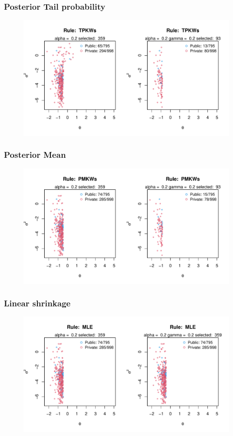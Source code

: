 \documentclass[10pt,mathserif]{beamer}
\begin{document}
\begin{frame}
  \frametitle{Posterior Tail probability}
  \begin{figure}
    \centering
    \includegraphics[width=\textwidth]{../../Figures/2013-2022/GMM/GLVmix/Left_0.2_0.2_TPKWs.pdf}
  \end{figure}
\end{frame}

\begin{frame}
  \frametitle{Posterior Mean}
  \begin{figure}
    \centering
    \includegraphics[width=\textwidth]{../../Figures/2013-2022/GMM/GLVmix/Left_0.2_0.2_PMKWs.pdf}
  \end{figure}
\end{frame}

\begin{frame}
  \frametitle{Linear shrinkage}
  \begin{figure}
    \centering
    \includegraphics[width=\textwidth]{../../Figures/2013-2022/GMM/GLVmix/Left_0.2_0.2_MLE.pdf}
  \end{figure}
\end{frame}
\end{document}
